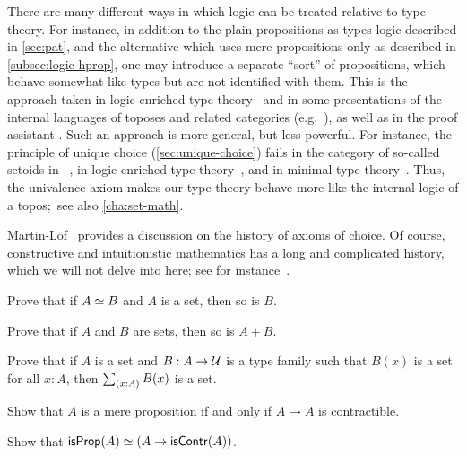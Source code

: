 There are many different ways in which logic can be treated relative to type theory.
For instance, in addition to the plain propositions-as-types logic described in \autoref{sec:pat}, and the alternative which uses mere propositions only as described in \autoref{subsec:logic-hprop}, one may introduce a separate ``sort'' of propositions, which behave somewhat like types but are not identified with them.
This is the approach taken in logic enriched type theory~\cite{aczel2002collection} and in some presentations of the internal languages of toposes and related categories (e.g.~\cite{jacobs1999categorical,elephant}), as well as in the proof assistant \Coq.
Such an approach is more general, but less powerful.
For instance, the principle of unique choice (\autoref{sec:unique-choice}) fails in the category of so-called setoids in \Coq~\cite{Spiwack}, in logic enriched type theory~\cite{aczel2002collection}, and in minimal type theory~\cite{maietti2005toward}.
Thus, the univalence axiom makes our type theory behave more like the internal logic of a topos;~see also \autoref{cha:set-math}.

Martin-L\"of~\cite{martin2006100} provides a discussion on the history of axioms of choice.
Of course, constructive and intuitionistic mathematics has a long and complicated history, which we will not delve into here; see for instance~\cite{TroelstraI,TroelstraII}.

\sectionExercises

\begin{ex}\label{ex:equiv-functor-set}
  Prove that if $A \simeq B$ and $A$ is a set, then so is $B$.
\end{ex}

\begin{ex}\label{ex:isset-coprod}
  Prove that if $A$ and $B$ are sets, then so is $A+B$.
\end{ex}

\begin{ex}\label{ex:isset-sigma}
  Prove that if $A$ is a set and $B:A\to \mathcal{U}$ is a type family such that $B(x)$ is a set for all $x:A$, then $\sm{x:A} B(x)$ is a set.
\end{ex}

\begin{ex}\label{ex:prop-endocontr}
  Show that $A$ is a mere proposition if and only if $A\to A$ is contractible.
\end{ex}

\begin{ex}\label{ex:prop-inhabcontr}
  Show that $\mathsf{isProp}(A) \simeq (A\to\mathsf{isContr}(A))$.
\end{ex}

